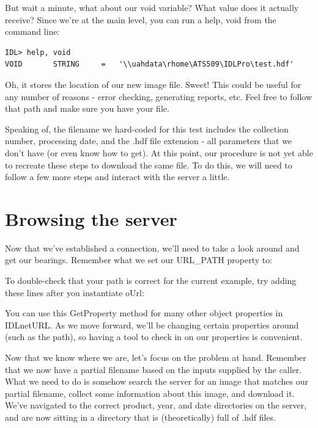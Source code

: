 \documentclass{book}
\newcounter{highlight}[page]
\newcommand{\tikzhighlightanchor}[1]{\ensuremath{\vcenter{\hbox{\tikz[remember picture, overlay]{\coordinate (#1 highlight \arabic{highlight});}}}}}
\newcommand{\bh}[0]{\stepcounter{highlight}\tikzhighlightanchor{begin}}
\newcommand{\eh}[0]{\tikzhighlightanchor{end}}
\theoremstyle{aside_style}
\begin{document}
But wait a minute, what about our void variable? What value does it actually receive?
Since we're at the main level, you can run a help, void from the command line:

\begin{lstlisting}
IDL> help, void
VOID       STRING     =   '\\uahdata\rhome\ATS509\IDLPro\test.hdf'
\end{lstlisting}

Oh, it stores the location of our new image file. Sweet! This could be useful for any number of reasons - error checking, generating reports, etc.
Feel free to follow that path and make sure you have your file.

Speaking of, the filename we hard-coded for this test includes the collection number, processing date, and the .hdf file extension - all parameters that we don't have (or even know how to get).
At this point, our procedure is not yet able to recreate these steps to download the same file.
To do this, we will need to follow a few more steps and interact with the server a little.

\section{Browsing the server}

Now that we've established a connection, we'll need to take a look around and get our bearings.
Remember what we set our URL\_PATH property to:


To double-check that your path is correct for the current example, try adding these lines after you instantiate oUrl:

\begin{idl}
\end{idl}

You can use this GetProperty method for many other object properties in IDLnetURL.
As we move forward, we'll be changing certain properties around (such as the path), so having a tool to check in on our properties is convenient.

Now that we know where we are, let's focus on the problem at hand.
Remember that we now have a partial filename based on the inputs supplied by the caller. 
What we need to do is somehow search the server for an image that matches our partial filename, collect some information about this image, and download it.
We've navigated to the correct product, year, and date directories on the server, and are now sitting in a directory that is (theoretically) full of .hdf files.
\end{document}
